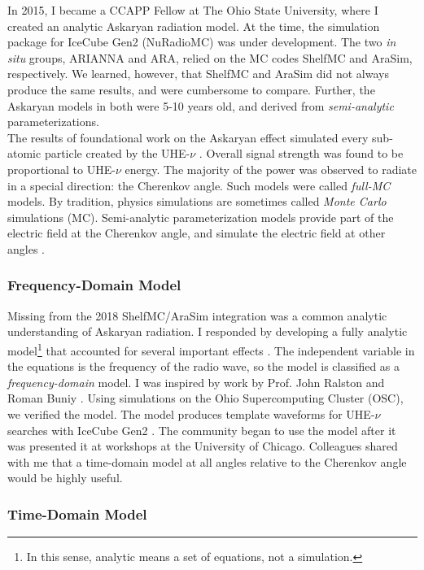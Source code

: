 \documentclass[../../../main.tex]{subfiles}
\begin{document}
In 2015, I became a CCAPP Fellow at The Ohio State University, where I created an analytic Askaryan radiation model.  At the time, the simulation package for IceCube Gen2 (NuRadioMC) was under development.  The two \textit{in situ} groups, ARIANNA and ARA, relied on the MC codes ShelfMC and AraSim, respectively.  We learned, however, that ShelfMC and AraSim did not always produce the same results, and were cumbersome to compare.  Further, the Askaryan models in both were 5-10 years old, and derived from \textit{semi-analytic} parameterizations.
\\
\vspace{0.15cm}
The results of foundational work on the Askaryan effect simulated every sub-atomic particle created by the UHE-$\nu$ \cite{zhs}.  Overall signal strength was found to be proportional to UHE-$\nu$ energy.  The majority of the power was observed to radiate in a special direction: the Cherenkov angle.  Such models were called \textit{full-MC} models.  By tradition, physics simulations are sometimes called \textit{Monte Carlo} simulations (MC).  Semi-analytic parameterization models provide part of the electric field at the Cherenkov angle, and simulate the electric field at other angles \cite{PhysRevD.101.083005}.

\subsubsection{Frequency-Domain Model}

Missing from the 2018 ShelfMC/AraSim integration was a common analytic understanding of Askaryan radiation.  I responded by developing a fully analytic model\footnote{In this sense, analytic means a set of equations, not a simulation.} that accounted for several important effects \cite{10.1016/j.astropartphys.2017.03.008}.  The independent variable in the equations is the frequency of the radio wave, so the model is classified as a \textit{frequency-domain} model.  I was inspired by work by Prof. John Ralston and Roman Buniy \cite{10.1103/physrevd.65.016003}.  Using simulations on the Ohio Supercomputing Cluster (OSC), we verified the model.  The model produces template waveforms for UHE-$\nu$ searches with IceCube Gen2 \cite{10.1016/j.astropartphys.2017.03.008}.  The community began to use the model after it was presented it at workshops at the University of Chicago.  Colleagues shared with me that a time-domain model at all angles relative to the Cherenkov angle would be highly useful.

\subsubsection{Time-Domain Model}
\end{document}
